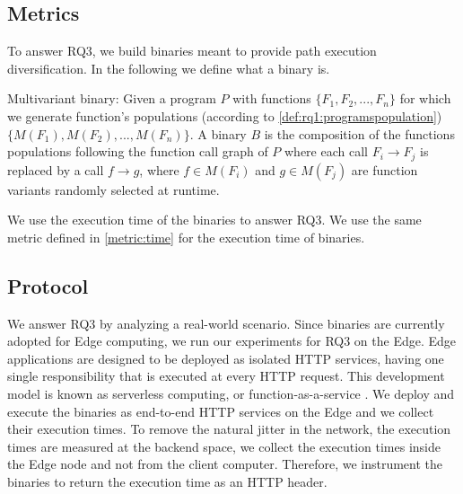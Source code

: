
\subsection*{Metrics}

To answer RQ3, we build \wasm binaries meant to provide path execution diversification. In the following we define what a binary is. 

\begin{definition}{Multivariant binary:}
    \label{def:multivariant_binary}
    \normalfont
    Given a program $P$ with functions $\{F_1, F_2, ..., F_n\}$ for which we generate function's populations (according to \autoref{def:rq1:programspopulation}) $\{M(F_1), M(F_2), ..., M(F_n)\}$. A binary $B$ is the composition of the functions populations following the function call graph of $P$ where each call $F_i \rightarrow F_j$ is replaced by a call $f \rightarrow g $, where $f\in M(F_i)$ and $g \in M(F_j)$ are function variants randomly selected at runtime. 

\end{definition}

We use the execution time of the binaries to answer RQ3. We use the same metric defined in \autoref{metric:time} for the execution time of binaries.

\subsection*{Protocol}

We answer RQ3 by analyzing a real-world scenario. Since binaries are currently adopted for Edge computing,
we run our experiments for RQ3 on the Edge. 
Edge applications are designed to be deployed as isolated HTTP services, having one single responsibility that is executed at every HTTP request. This development model is known as serverless computing, or function-as-a-service \cite{shillaker2020faasm,Narayan2021Swivel}. 
We deploy and execute the binaries as end-to-end HTTP services on the Edge and we collect their execution times.
To remove the natural jitter in the network, the execution times are measured at the backend space, \ie we collect the execution times inside the Edge node and not from the client computer. 
Therefore, we instrument the binaries to return the execution time as an HTTP header. 

